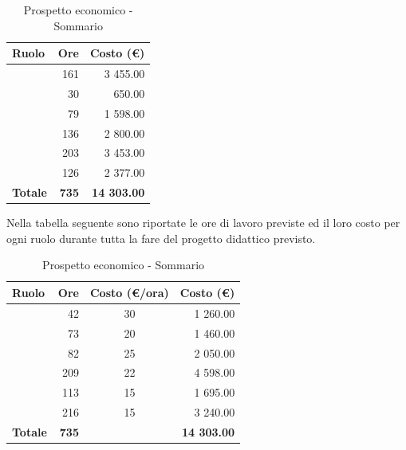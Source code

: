 \documentclass[12pt,a4paper]{article}
\begin{document}
\begin{table}[H]
	\begin{center}
		\begin{tabular}{l r r}
			\toprule
			\textbf{Ruolo}	& \textbf{Ore} & \textbf{Costo (\euro)} \\ \midrule
			\midrule
			\FA{} & 161 & 3 455.00 \\ \midrule
			\FAD{} & 30 & 650.00 \\ \midrule
			\FPA{} & 79 & 1 598.00 \\ \midrule
			\FPD{} & 136 & 2 800.00 \\ \midrule
			\FPDC{} & 203 & 3 453.00 \\ \midrule
			\FVV{} & 126 & 2 377.00 \\ \midrule
			\textbf{Totale} & \textbf{735} & \textbf{14 303.00} \\
			\bottomrule
		\end{tabular}
		\caption{Prospetto economico - Sommario}
	\end{center}
\end{table}

Nella tabella seguente sono riportate le ore di lavoro previste ed il loro costo per ogni ruolo durante tutta la fare del progetto didattico previsto.

\begin{table}[H]
	\begin{center}
		\begin{tabular}{l r c r}
			\toprule
			\textbf{Ruolo}	& \textbf{Ore} & \textbf{Costo (\euro/ora)}	& \textbf{Costo (\euro)} \\ \midrule
			\midrule
			\RE{} & 42 & 30 & 1 260.00 \\ \midrule
			\AM{} & 73 & 20 & 1 460.00 \\ \midrule
			\AN{} & 82 & 25 & 2 050.00 \\ \midrule
			\PG{} & 209 & 22 & 4 598.00 \\ \midrule
			\PR{} & 113 & 15 & 1 695.00 \\ \midrule
			\VR{} & 216 & 15 & 3 240.00 \\ \midrule
			\textbf{Totale} & \textbf{735} &  & \textbf{14 303.00} \\
			\bottomrule
		\end{tabular}
		\caption{Prospetto economico - Sommario}
	\end{center}
\end{table}
\end{document}
